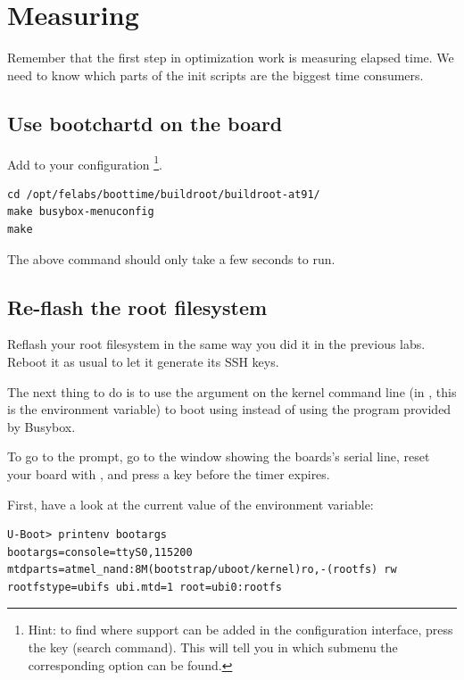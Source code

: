 
\section{Measuring}

Remember that the first step in optimization work is measuring elapsed
time. We need to know which parts of the init scripts are the biggest
time consumers. 

\subsection{Use bootchartd on the board}

Add  to your  configuration
\footnote{Hint: to find where  support can be
added in the  configuration interface, press the \code{/}
key (search command). This will tell you in which submenu the
corresponding option can be found.}.

\begin{verbatim}
cd /opt/felabs/boottime/buildroot/buildroot-at91/
make busybox-menuconfig
make
\end{verbatim}

The above command should only take a few seconds to run.

\subsection{Re-flash the root filesystem}

Reflash your root filesystem in the same way you did it in the previous
labs. Reboot it as usual to let it generate its SSH keys.

The next thing to do is to use the  argument on the
kernel command line (in , this is the 
environment variable) to boot using  instead of using
the  program provided by Busybox.

To go to the  prompt, go to the  window
showing the boards's serial line, reset your board with , and
press a key before the timer expires.

First, have a look at the current value of the 
environment variable:

\begin{verbatim}
U-Boot> printenv bootargs
bootargs=console=ttyS0,115200
mtdparts=atmel_nand:8M(bootstrap/uboot/kernel)ro,-(rootfs) rw
rootfstype=ubifs ubi.mtd=1 root=ubi0:rootfs
\end{verbatim}


